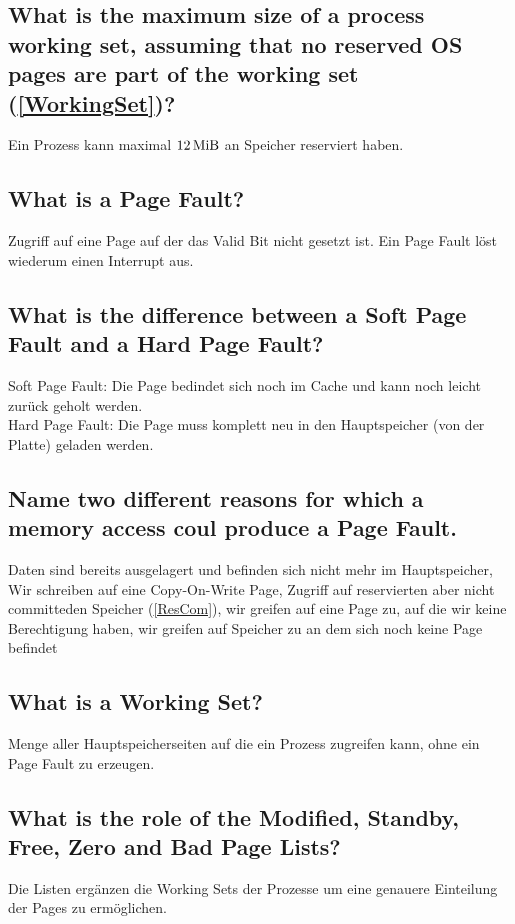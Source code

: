 \subsection{What is the maximum size of a process working set, assuming that no reserved OS pages are part of the working set (\ref{WorkingSet})?}
Ein Prozess kann maximal $12 \operatorname{MiB}$ an Speicher reserviert haben.

\subsection{What is a Page Fault?}
Zugriff auf eine Page auf der das Valid Bit nicht gesetzt ist. Ein Page Fault löst wiederum einen Interrupt aus.

\subsection{What is the difference between a Soft Page Fault and a Hard Page Fault?}
Soft Page Fault: Die Page bedindet sich noch im Cache und kann noch leicht zurück geholt werden.\\
Hard Page Fault: Die Page muss komplett neu in den Hauptspeicher (von der Platte) geladen werden.

\subsection{Name two different reasons for which a memory access coul produce a Page Fault.}
Daten sind bereits ausgelagert und befinden sich nicht mehr im Hauptspeicher, Wir schreiben auf eine Copy-On-Write Page, Zugriff auf reservierten aber nicht committeden Speicher (\ref{ResCom}), wir greifen auf eine Page zu, auf die wir keine Berechtigung haben, wir greifen auf Speicher zu an dem sich noch keine Page befindet

\subsection{What is a Working Set?\label{WorkingSet}}
Menge aller Hauptspeicherseiten auf die ein Prozess zugreifen kann, ohne ein Page Fault zu erzeugen.

\subsection{What is the role of the Modified, Standby, Free, Zero and Bad Page Lists?}
Die Listen ergänzen die Working Sets der Prozesse um eine genauere Einteilung der Pages zu ermöglichen.

